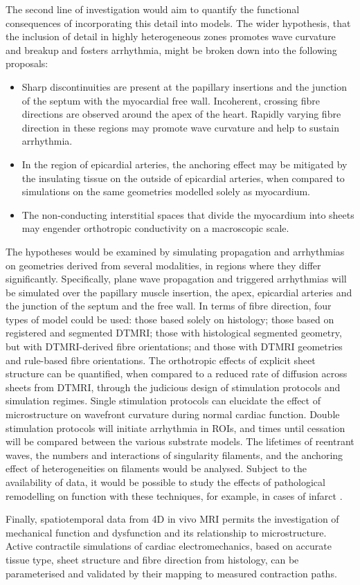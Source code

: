   The second line of investigation would aim to quantify the functional consequences of incorporating this detail into models. The wider hypothesis, that the inclusion of detail in highly heterogeneous zones promotes wave curvature and breakup and fosters arrhythmia, might be broken down into the following proposals:
  \begin{itemize}
    \item Sharp discontinuities are present at the papillary insertions and the junction of the septum with the myocardial free wall. Incoherent, crossing fibre directions are observed around the apex of the heart. Rapidly varying fibre direction in these regions may promote wave curvature and help to sustain arrhythmia.
    \item In the region of epicardial arteries, the anchoring effect may be mitigated by the insulating tissue on the outside of epicardial arteries, when compared to simulations on the same geometries modelled solely as myocardium.
    \item The non-conducting interstitial spaces that divide the myocardium into sheets may engender orthotropic conductivity on a macroscopic scale.
  \end{itemize}
  
  The hypotheses would be examined by simulating propagation and arrhythmias on geometries derived from several modalities, in regions where they differ significantly. Specifically, plane wave propagation and triggered arrhythmias will be simulated over the papillary muscle insertion, the apex, epicardial arteries and the junction of the septum and the free wall. In terms of fibre direction, four types of model could be used: those based solely on histology; those based on registered and segmented DTMRI; those with histological segmented geometry, but with DTMRI-derived fibre orientations; and those with DTMRI geometries and rule-based fibre orientations. The orthotropic effects of explicit sheet structure can be quantified, when compared to a reduced rate of diffusion across sheets from DTMRI, through the judicious design of stimulation protocols and simulation regimes. Single stimulation protocols can elucidate the effect of microstructure on wavefront curvature during normal cardiac function. Double stimulation protocols will initiate arrhythmia in ROIs, and times until cessation will be compared between the various substrate models. The lifetimes of reentrant waves, the numbers and interactions of singularity filaments, and the anchoring effect of heterogeneities on filaments would be analysed. Subject to the availability of data, it would be possible to study the effects of pathological remodelling on function with these techniques, for example, in cases of infarct \cite{Rutherford2012}.
  
  Finally, spatiotemporal data from 4D in vivo MRI permits the investigation of mechanical function and dysfunction and its relationship to microstructure. Active contractile simulations of cardiac electromechanics, based on accurate tissue type, sheet structure and fibre direction from histology, can be parameterised and validated by their mapping to measured contraction paths.
